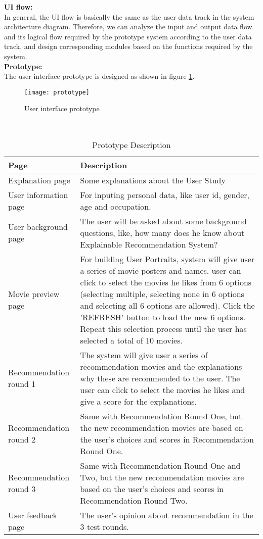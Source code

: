 \textbf{UI flow:}\\
In general, the UI flow is basically the same as the user data track in the system architecture diagram. Therefore, we can analyze the input and output data flow and its logical flow required by the prototype system according to the user data track, and design corresponding modules based on the functions required by the system.\\
\textbf{Prototype:}\\
The user interface prototype is designed as shown in figure \ref{figure:12}.

\begin{figure}[h]
\caption{User interface prototype}
\label{figure:12}
\centering
\texttt{[image: prototype]}
\end{figure}
\leavevmode\\


\begin{table}[h!]
\renewcommand\arraystretch{1.5}
\centering
\begin{tabular}{p{100pt}p{300pt}}\toprule
 \hline
 Page & Description \\ [0.5ex] 
 \hline
  Explanation page & Some explanations about the User Study \\
User information page &  For inputing personal data, like user id, gender, age and occupation.\\
User background page  &  The user will be asked about some background questions, like, how many does he know about Explainable Recommendation System?\\
Movie preview page  &  For building User Portraits, system will give user a series of movie posters and names. user can click to select the movies he likes from 6 options (selecting multiple, selecting none in 6 options and selecting all 6 options are allowed). Click the 'REFRESH' button to load the new 6 options. Repeat this selection process until the user has selected a total of 10 movies. \\
Recommendation round 1  &  The system will give user a series of recommendation movies and the explanations why these are recommended to the user. The user can click to select the movies he likes and give a score for the explanations. \\
Recommendation round 2  &  Same with Recommendation Round One, but the new recommendation movies are based on the user's choices and scores in Recommendation Round One. \\
Recommendation round 3  &  Same with Recommendation Round One and Two, but the new recommendation movies are based on the user's choices and scores in Recommendation Round Two. \\
User feedback page   &  The user's opinion about recommendation in the 3 test rounds.\\
  [1ex] 
 \hline
\end{tabular}
\caption{Prototype Description}
\label{table:1}
\end{table}


\cleardoublepage